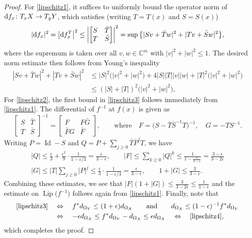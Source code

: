 \documentclass[pdftex]{sigma}
\numberwithin{equation}{section}
\theoremstyle{definition}
\newcommand{\C}{\mathbb{C}} %
\newcommand{\1}{{\bf 1}}
\newcommand{\Id}{\operatorname{Id}}
\DeclareMathOperator{\Lip}{Lip}
\begin{document}
\begin{proof} For \ref{lipschitz1}, it suffices to uniformly bound the operator norm of ${\rm d}f_x\colon T_xX \rightarrow T_yY$, which satisfies (writing $T=T(x)$ and $S=S(x)$)
\[
\vert {\rm d}f_x \vert^2 = \big\vert {\rm d}f_x^T \big\vert^2 \le \left | \begin{bmatrix}
S &\bar T\\
T & \bar S
\end{bmatrix} \right|^2 =\sup \big\{|Sv + \bar T w|^2 +| Tv + \bar S w |^2\big\},
\]
where the supremum is taken over all $v,w\in \C^m$ with $|v|^2+|w|^2\le 1$. The desired norm estimate then follows from Young's inequality
\begin{align*}
|Sv + \bar T w|^2 +| Tv + \bar S w |^2 & \le |S|^2 \bigl(|v|^2 + |w|^2\bigr) + 4 |S||T||v||w|+ |T|^2 \bigl(|v|^2 + |w|^2\bigr) \\
& \le (|S| + |T|)^2\bigl(|v|^2+ |w|^2\bigr),
\end{align*}
For \ref{lipschitz2}, the first bound in \eqref{lipschitz3} follows immediately from \ref{lipschitz1}. The differential of $f^{-1}$ at $f(x)$ is given as
\begin{equation*}
\begin{bmatrix}
	S & \bar T\\
	T & \bar S
\end{bmatrix}^{-1} = \begin{bmatrix}
	F & F\bar G\\
	\bar F G & \bar F
\end{bmatrix},\qquad \text{where}\quad F= \bigl(S-\bar T \bar S^{-1}T\bigr)^{-1},\quad G= - TS^{-1}.
\end{equation*}
Writing $P=\Id - S$ and $Q = P + \sum_{j\ge 0}\bar T \bar P^j T$, we have
\begin{gather*}
|Q| \le \frac \epsilon 3 + \frac {\epsilon^2} 9 \cdot \frac{1}{1-\epsilon/3} = \frac \epsilon {3-\epsilon},\qquad \vert F\vert\le \sum_{k\ge 0}|Q|^k\le \frac{1}{1-\frac{\epsilon}{3-\epsilon}} = \frac{3-\epsilon}{3-2\epsilon}\\
|G| \le |T| \sum_{j\ge 0} |P|^j \le \frac \epsilon 3 \cdot \frac{1}{1-\epsilon/3} = \frac{\epsilon}{3-\epsilon},\qquad 1 + |G| \le \frac{3}{3-\epsilon}.
\end{gather*}
Combining these estimates, we see that
$
|F| (1+|G|) \le \frac{3}{3-2\epsilon} \le \frac{1}{1-\epsilon}
$
and the estimate on $\Lip\bigl(f^{-1}\bigr)$ follows again from \ref{lipschitz1}. Finally, note that
\begin{align*}
\eqref{lipschitz3}\quad &\Leftrightarrow \quad f^*d_{\Omega_Y} \le (1+\epsilon) d_{\Omega_X} \qquad\text{and}\qquad d_{\Omega_X}\le (1-\epsilon)^{-1} f^*d_{\Omega_Y}\\
&\Leftrightarrow \quad -\epsilon d_{\Omega_X} \le f^*d_{\Omega_Y} - d_{\Omega_X} \le \epsilon d_{\Omega_X}\quad \Leftrightarrow \quad \eqref{lipschitz4},
\end{align*}
which completes the proof.
\end{proof}
\end{document}
